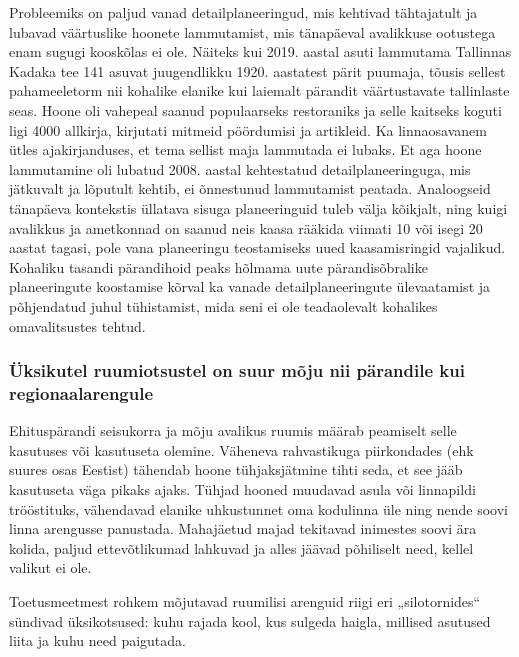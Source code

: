 \documentclass[estonian,]{article}
\begin{document}
Probleemiks on paljud vanad detailplaneeringud, mis kehtivad tähtajatult ja lubavad väärtuslike hoonete lammutamist, mis tänapäeval avalikkuse ootustega enam sugugi kooskõlas ei ole. Näiteks kui 2019. aastal asuti lammutama Tallinnas Kadaka tee 141 asuvat juugendlikku 1920. aastatest pärit puumaja, tõusis sellest pahameeletorm nii kohalike elanike kui laiemalt pärandit väärtustavate tallinlaste seas. Hoone oli vahepeal saanud populaarseks restoraniks ja selle kaitseks koguti ligi 4000 allkirja, kirjutati mitmeid pöördumisi ja artikleid. Ka linnaosavanem ütles ajakirjanduses, et tema sellist maja lammutada ei lubaks. Et aga hoone lammutamine oli lubatud 2008. aastal kehtestatud detailplaneeringuga, mis jätkuvalt ja lõputult kehtib, ei õnnestunud lammutamist peatada. Analoogseid tänapäeva kontekstis üllatava sisuga planeeringuid tuleb välja kõikjalt, ning kuigi avalikkus ja ametkonnad on saanud neis kaasa rääkida viimati 10 või isegi 20 aastat tagasi, pole vana planeeringu teostamiseks uued kaasamisringid vajalikud. Kohaliku tasandi pärandihoid peaks hõlmama uute pärandisõbralike planeeringute koostamise kõrval ka vanade detailplaneeringute ülevaatamist ja põhjendatud juhul tühistamist, mida seni ei ole teadaolevalt kohalikes omavalitsustes tehtud.

\hypertarget{uxfcksikutel-ruumiotsustel-on-suur-muxf5ju-nii-puxe4randile-kui-regionaalarengule}{%
\subsubsection*{Üksikutel ruumiotsustel on suur mõju nii pärandile kui regionaalarengule}\label{uxfcksikutel-ruumiotsustel-on-suur-muxf5ju-nii-puxe4randile-kui-regionaalarengule}}

Ehituspärandi seisukorra ja mõju avalikus ruumis määrab peamiselt selle kasutuses või kasutuseta olemine. Väheneva rahvastikuga piirkondades (ehk suures osas Eestist) tähendab hoone tühjaksjätmine tihti seda, et see jääb kasutuseta väga pikaks ajaks. Tühjad hooned muudavad asula või linnapildi trööstituks, vähendavad elanike uhkustunnet oma kodulinna üle ning nende soovi linna arengusse panustada. Mahajäetud majad tekitavad inimestes soovi ära kolida, paljud ettevõtlikumad lahkuvad ja alles jäävad põhiliselt need, kellel valikut ei ole.

\begin{blockquote-left}
Toetusmeetmest rohkem mõjutavad ruumilisi arenguid riigi eri
„silotornides`` sündivad üksikotsused: kuhu rajada kool, kus sulgeda
haigla, millised asutused liita ja kuhu need paigutada.
\end{blockquote-left}
\end{document}
